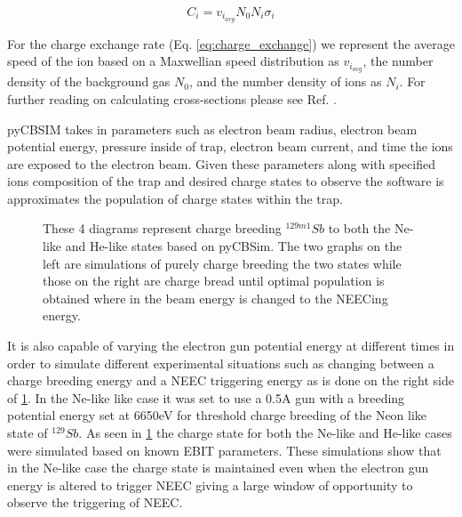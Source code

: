 \documentclass[jon_ringuette_thesis_proposal.tex]{subfiles}
\begin{document}
    \begin{equation}
        C_i = v_{i_{avg}} N_0 N_i \sigma_{i}
        \label{eq:charge_exchange}
    \end{equation}

    For the charge exchange rate (Eq. \ref{eq:charge_exchange}) we represent the average speed of the ion based on a Maxwellian speed distribution as $v_{i_{avg}}$, the number density of the background gas $N_0$, and the number density of ions as $N_i$.
    For further reading on calculating cross-sections please see Ref. \cite{Currell2005} .

    pyCBSIM takes in parameters such as electron beam radius, electron beam potential energy, pressure inside of trap, electron beam current, and time the ions are exposed to the electron beam.
    Given these parameters along with specified ions composition of the trap and desired charge states to observe the software is approximates the population of charge states within the trap.
    \begin{figure}[H]
        \centering
        \hspace{0mm}
        \caption{\small These 4 diagrams represent charge breeding $^{129m1}Sb$ to both the Ne-like and He-like states based on pyCBSim. The two graphs on the left are simulations of purely charge breeding the two states while those on the right are charge bread until optimal population is obtained where in the beam energy is changed to the NEECing energy.}
        \label{fig:sb129_cb_sim}
    \end{figure}

    It is also capable of varying the electron gun potential energy at different times in order to simulate different experimental situations such as changing between a charge breeding energy and a NEEC triggering energy as is done on the right side of \ref{fig:sb129_cb_sim}.
    In the Ne-like like case it was set to use a 0.5A gun with a breeding potential energy set at 6650eV for threshold charge breeding of the Neon like state of $^{129}Sb$.
    As seen in \ref{fig:sb129_cb_sim} the charge state for both the Ne-like and He-like cases were simulated based on known EBIT parameters.
    These simulations show that in the Ne-like case the charge state is maintained even when the electron gun energy is altered to trigger NEEC giving a large window of opportunity to observe the triggering of NEEC.
\end{document}
